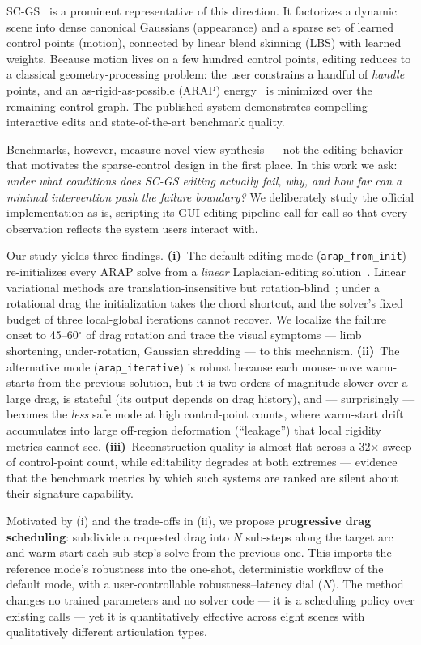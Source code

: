 \documentclass[10pt,twocolumn]{article}
\newcommand{\fromInit}{\texttt{arap\_from\_init}}
\newcommand{\iterMode}{\texttt{arap\_iterative}}
\begin{document}
SC-GS~\cite{scgs} is a prominent representative of this direction. It factorizes
a dynamic scene into dense canonical Gaussians (appearance) and a sparse set of
learned control points (motion), connected by linear blend skinning (LBS) with
learned weights. Because motion lives on a few hundred control points, editing
reduces to a classical geometry-processing problem: the user constrains a
handful of \emph{handle} points, and an as-rigid-as-possible (ARAP)
energy~\cite{arap} is minimized over the remaining control graph. The published
system demonstrates compelling interactive edits and state-of-the-art benchmark
quality.

Benchmarks, however, measure novel-view synthesis --- not the editing behavior
that motivates the sparse-control design in the first place. In this work we
ask: \emph{under what conditions does SC-GS editing actually fail, why, and how
far can a minimal intervention push the failure boundary?} We deliberately study
the official implementation as-is, scripting its GUI editing pipeline
call-for-call so that every observation reflects the system users interact
with.

Our study yields three findings. \textbf{(i)}~The default editing mode
(\fromInit{}) re-initializes every ARAP solve from a \emph{linear}
Laplacian-editing solution~\cite{lse}. Linear variational methods are
translation-insensitive but rotation-blind~\cite{botsch}; under a rotational
drag the initialization takes the chord shortcut, and the solver's fixed budget
of three local-global iterations cannot recover. We localize the failure onset
to 45--60$^\circ$ of drag rotation and trace the visual symptoms --- limb
shortening, under-rotation, Gaussian shredding --- to this mechanism.
\textbf{(ii)}~The alternative mode (\iterMode{}) is robust because each
mouse-move warm-starts from the previous solution, but it is two orders of
magnitude slower over a large drag, is stateful (its output depends on drag
history), and --- surprisingly --- becomes the \emph{less} safe mode at high
control-point counts, where warm-start drift accumulates into large off-region
deformation (``leakage'') that local rigidity metrics cannot see.
\textbf{(iii)}~Reconstruction quality is almost flat across a 32$\times$ sweep
of control-point count, while editability degrades at both extremes ---
evidence that the benchmark metrics by which such systems are ranked are silent
about their signature capability.

Motivated by (i) and the trade-offs in (ii), we propose \textbf{progressive
drag scheduling}: subdivide a requested drag into $N$ sub-steps along the
target arc and warm-start each sub-step's solve from the previous one. This
imports the reference mode's robustness into the one-shot, deterministic
workflow of the default mode, with a user-controllable robustness--latency dial
($N$). The method changes no trained parameters and no solver code --- it is a
scheduling policy over existing calls --- yet it is quantitatively effective
across eight scenes with qualitatively different articulation types.
\end{document}
